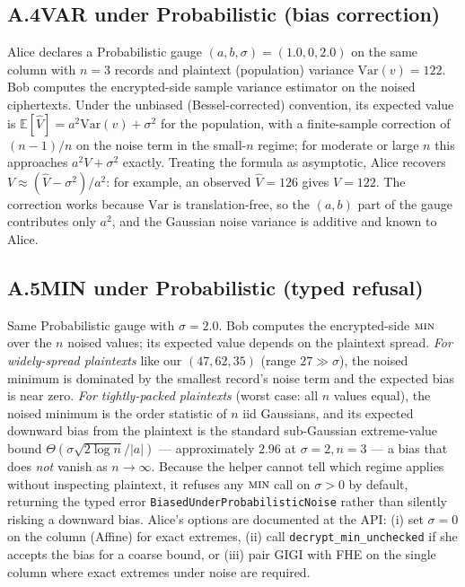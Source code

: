 \documentclass[11pt,letterpaper]{article}
\begin{document}
\subsection*{A.4\quad VAR under Probabilistic (bias correction)}
Alice declares a Probabilistic gauge $(a, b, \sigma) = (1.0, 0,
2.0)$ on the same column with $n = 3$ records and plaintext
(population) variance $\mathrm{Var}(v) = 122$. Bob computes the
encrypted-side sample variance estimator on the noised
ciphertexts. Under the unbiased (Bessel-corrected) convention,
its expected value is
$\mathbb{E}[\widehat{V}] = a^2 \mathrm{Var}(v) + \sigma^2$ for
the population, with a finite-sample correction of $(n{-}1)/n$
on the noise term in the small-$n$ regime; for moderate or
large $n$ this approaches $a^2 V + \sigma^2$ exactly. Treating
the formula as asymptotic, Alice recovers
$V \approx (\widehat{V} - \sigma^2) / a^2$: for example, an
observed $\widehat{V} = 126$ gives $V = 122$. The correction
works because $\mathrm{Var}$ is translation-free, so the
$(a, b)$ part of the gauge contributes only $a^2$, and the
Gaussian noise variance is additive and known to Alice.

\subsection*{A.5\quad MIN under Probabilistic (typed refusal)}
Same Probabilistic gauge with $\sigma = 2.0$. Bob computes the
encrypted-side $\textsc{min}$ over the $n$ noised values; its
expected value depends on the plaintext spread. \emph{For
widely-spread plaintexts} like our $(47, 62, 35)$ (range
$27 \gg \sigma$), the noised minimum is dominated by the
smallest record's noise term and the expected bias is near
zero. \emph{For tightly-packed plaintexts} (worst case: all
$n$ values equal), the noised minimum is the order statistic
of $n$ iid Gaussians, and its expected downward bias from the
plaintext is the standard sub-Gaussian extreme-value bound
$\Theta(\sigma \sqrt{2 \log n} / |a|)$ --- approximately
$2.96$ at $\sigma = 2, n = 3$ --- a bias that does \emph{not}
vanish as $n \to \infty$. Because the helper cannot tell which
regime applies without inspecting plaintext, it refuses any
$\textsc{min}$ call on $\sigma > 0$ by default, returning the
typed error \texttt{BiasedUnderProbabilisticNoise} rather than
silently risking a downward bias. Alice's options are
documented at the API: (i) set $\sigma = 0$ on the column
(Affine) for exact extremes, (ii) call
\texttt{decrypt\_min\_unchecked} if she accepts the bias for a
coarse bound, or (iii) pair GIGI with FHE on the single column
where exact extremes under noise are required.
\end{document}
